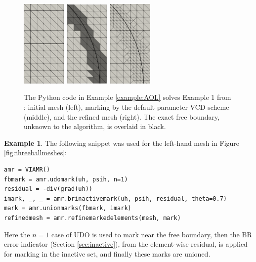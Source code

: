 \documentclass[]{interact}
\theoremstyle{plain}%
\theoremstyle{definition}
\newtheorem{example}[theorem]{Example}
\theoremstyle{remark}
\begin{document}
\begin{figure}[ht]
\centering
\mbox{\includegraphics[width=0.19\textwidth]{static/aol-mesh.png} \qquad\qquad
\includegraphics[width=0.19\textwidth]{static/aol-marked.png} \qquad\qquad
\includegraphics[width=0.19\textwidth]{static/aol-refinedmesh.png}}
\caption{The Python code in Example \ref{example:AOL} solves Example 1 from \cite{AinsworthOdenLee1993}: initial mesh (left), marking by the default-parameter VCD scheme (middle), and the refined mesh (right).  The exact free boundary, unknown to the algorithm, is overlaid in black.}
\label{fig:resultAOL}
\end{figure}

\begin{example} \label{example:hybrid}
The following snippet was used for the left-hand mesh in Figure \ref{fig:threeballmeshes}:
\begin{verbatim}
amr = VIAMR()
fbmark = amr.udomark(uh, psih, n=1)
residual = -div(grad(uh))
imark, _, _ = amr.brinactivemark(uh, psih, residual, theta=0.7)
mark = amr.unionmarks(fbmark, imark)
refinedmesh = amr.refinemarkedelements(mesh, mark)
\end{verbatim}
Here the $n=1$ case of UDO is used to mark near the free boundary, then the BR error indicator (Section \ref{sec:inactive}), from the element-wise residual, is applied for marking in the inactive set, and finally these marks are unioned.
\end{example}
\end{document}
